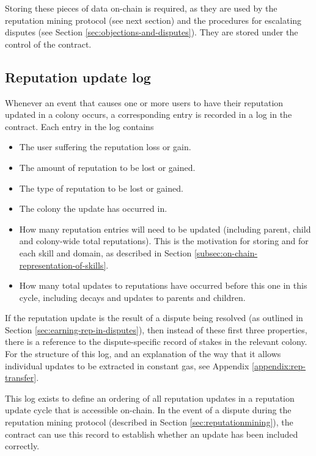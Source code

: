 Storing these pieces of data on-chain is required, as they are used by the reputation mining protocol (see next section) and the procedures for escalating disputes (see Section \ref{sec:objections-and-disputes}). They are stored under the control of the  contract.

\subsection{Reputation update log}\label{subsec:reputation-update-log}

Whenever an event that causes one or more users to have their reputation updated in a colony occurs, a corresponding entry is recorded in a log in the  contract. Each entry in the log contains

\begin{itemize}
\item The user suffering the reputation loss or gain.
\item The amount of reputation to be lost or gained.
\item The type of reputation to be lost or gained.
\item The colony the update has occurred in.
\item How many reputation entries will need to be updated (including parent, child and colony-wide total reputations). This is the motivation for storing  and  for each skill and domain, as described in Section \ref{subsec:on-chain-representation-of-skills}.
\item How many total updates to reputations have occurred before this one in this cycle, including decays and updates to parents and children.
\end{itemize}

If the reputation update is the result of a dispute being resolved (as outlined in Section \ref{sec:earning-rep-in-disputes}), then instead of these first three properties, there is a reference to the dispute-specific record of stakes in the relevant colony. For the structure of this log, and an explanation of the way that it allows individual updates to be extracted in constant gas, see Appendix \ref{appendix:rep-transfer}.

This log exists to define an ordering of all reputation updates in a reputation update cycle that is accessible on-chain. In the event of a dispute during the reputation mining protocol (described in Section \ref{sec:reputationmining}), the  contract can use this record to establish whether an update has been included correctly.
